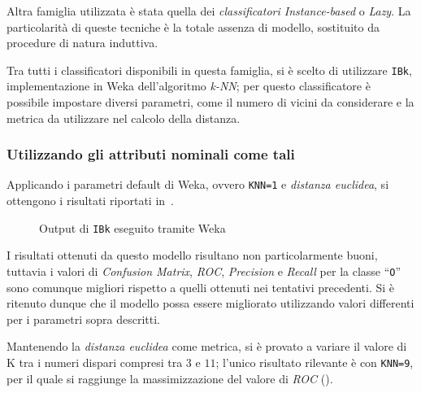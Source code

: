 Altra famiglia utilizzata è stata quella dei \emph{classificatori Instance-based} o \emph{Lazy}.
La particolarità di queste tecniche è la totale assenza di modello, sostituito da procedure di natura induttiva.

Tra tutti i classificatori disponibili in questa famiglia, si è scelto di utilizzare \texttt{IBk}, implementazione in Weka dell'algoritmo \emph{k-NN};
per questo classificatore è possibile impostare diversi parametri, come il numero di vicini da considerare e la metrica da utilizzare nel calcolo della distanza.

\subsubsection{Utilizzando gli attributi nominali come tali}

Applicando i parametri default di Weka, ovvero \texttt{KNN=1} e \emph{distanza euclidea}, si ottengono i risultati riportati in~.

\begin{figure}[H]
  \centering
  \caption{Output di \texttt{IBk} eseguito tramite Weka}%
  \label{fig:ibk:1}
\end{figure}

I risultati ottenuti da questo modello risultano non particolarmente buoni, tuttavia i valori di \emph{Confusion Matrix}, \emph{ROC}, \emph{Precision} e \emph{Recall} per la classe ``\texttt{O}'' sono comunque migliori rispetto a quelli ottenuti nei tentativi precedenti.
Si è ritenuto dunque che il modello possa essere migliorato utilizzando valori differenti per i parametri sopra descritti.

Mantenendo la \emph{distanza euclidea} come metrica, si è provato a variare il valore di K tra i numeri dispari compresi tra \(3\) e \(11\);
l'unico risultato rilevante è con \texttt{KNN=9}, per il quale si raggiunge la massimizzazione del valore di \emph{ROC} ().


